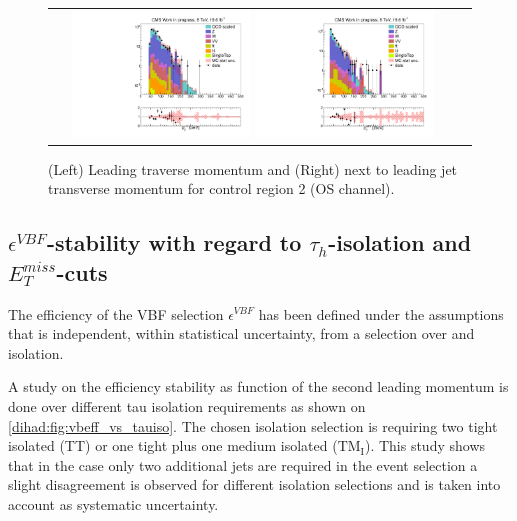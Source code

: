 \begin{figure}[tbh!]
	\centering
	\begin{tabular}{cc}
		\includegraphics[width=0.45\textwidth]{PLOTS/diTauHadLSQCDPlots/AllMCdiced/OS_CR2/OS_Central_invertedVBF_2TightIso_CR2/h_tau1pt_log.pdf}
		\includegraphics[width=0.45\textwidth]{PLOTS/diTauHadLSQCDPlots/AllMCdiced/OS_CR2/OS_Central_invertedVBF_2TightIso_CR2/h_jet2pt_log.pdf} 		
	\end{tabular}
	\caption{(Left) Leading \hadtau traverse momentum and (Right) next to leading jet transverse momentum for control region 2 (OS channel).}
	\label{fig::CR2_controlplots2}
\end{figure}

\subsection{$\epsilon^{VBF}$-stability with regard to $\tau_{h}$-isolation and $E_{T}^{miss}$-cuts}
\label{dihad:subsec:stability}
\FloatBarrier

The efficiency of the VBF selection $\epsilon^{VBF}$ has been defined under the assumptions that is independent, within statistical uncertainty, from a selection over \met and \hadtau isolation.
 
 A study on the efficiency stability as function of the second leading \hadtau momentum is done over different tau isolation requirements as shown on \autoref{dihad:fig:vbeff_vs_tauiso}. The chosen \hadtau isolation selection is requiring two tight isolated \hadtau (TT) or one tight plus one medium isolated \hadtau ($\text{TM}_{\text{I}}$). This study shows that in the case only two additional jets are required in the event selection a slight disagreement is observed for different isolation selections and is taken into account as systematic uncertainty.


